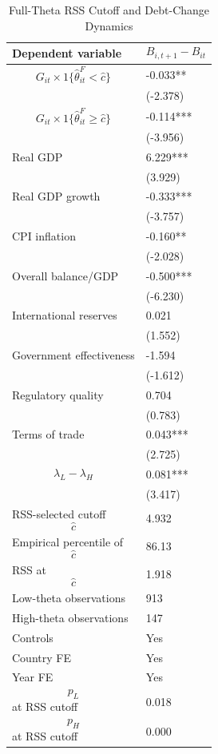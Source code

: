 \begin{table}[H]\centering
\begin{threeparttable}
\caption{Full-Theta RSS Cutoff and Debt-Change Dynamics}
\label{tab:deltaB_rss_cutoff_fulltheta}
\scriptsize
\begin{tabularx}{\textwidth}{lY}
\toprule
Dependent variable & $$B_{i,t+1}-B_{it}$$ \\
\midrule
$$G_{it}\times 1\{\widehat{\theta}^{F}_{it}<\widehat{c}\}$$ & -0.033** \\
 & (-2.378) \\
$$G_{it}\times 1\{\widehat{\theta}^{F}_{it}\geq\widehat{c}\}$$ & -0.114*** \\
 & (-3.956) \\
Real GDP & 6.229*** \\
 & (3.929) \\
Real GDP growth & -0.333*** \\
 & (-3.757) \\
CPI inflation & -0.160** \\
 & (-2.028) \\
Overall balance/GDP & -0.500*** \\
 & (-6.230) \\
International reserves & 0.021 \\
 & (1.552) \\
Government effectiveness & -1.594 \\
 & (-1.612) \\
Regulatory quality & 0.704 \\
 & (0.783) \\
Terms of trade & 0.043*** \\
 & (2.725) \\
$$\lambda_L-\lambda_H$$ & 0.081*** \\
 & (3.417) \\
\midrule
RSS-selected cutoff $$\widehat{c}$$ & 4.932 \\
Empirical percentile of $$\widehat{c}$$ & 86.13 \\
RSS at $$\widehat{c}$$ & 1.918 \\
Low-theta observations & 913 \\
High-theta observations & 147 \\
Controls & Yes \\
Country FE & Yes \\
Year FE & Yes \\
$$p_L$$ at RSS cutoff & 0.018 \\
$$p_H$$ at RSS cutoff & 0.000 \\

\end{tabularx}
\end{threeparttable}
\end{table}
